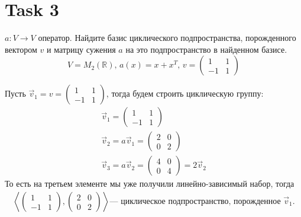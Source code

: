 \section{Task 3}
\begin{task}
    $a:V\longrightarrow V$ оператор. Найдите базис циклического подпространства, порожденного вектором $v$ и матрицу сужения $a$ на это подпространство в найденном базисе. $$V=M_2(\mathbb{R}),\, a(x)=x+x^T,\, v=\begin{pmatrix}1&1\\-1&1\end{pmatrix}$$
\end{task}

\begin{solution}
    Пусть $\vec{v}_1 = v = 
    \begin{pmatrix}
        1 & 1 \\
        -1 & 1
    \end{pmatrix}$, тогда будем строить циклическую группу:
    \begin{gather}
        \vec{v}_1 = 
        \begin{pmatrix}
             1 & 1 \\
            -1 & 1
        \end{pmatrix} \\
        \vec{v}_2 = a\vec{v}_1 = 
        \begin{pmatrix}
            2 & 0 \\ 0 & 2
        \end{pmatrix} \\
        \vec{v}_3 = a\vec{v}_2 = 
        \begin{pmatrix}
            4 & 0 \\ 0 & 4
        \end{pmatrix} = 2\vec{v}_2
    \end{gather}
    То есть на третьем элементе мы уже получили линейно-зависимый набор, тогда
    \begin{eqnarray}
        \left<
            \begin{pmatrix}
                1 & 1 \\ -1 & 1
            \end{pmatrix},
            \begin{pmatrix}
                2 & 0 \\
                0 & 2
            \end{pmatrix}
        \right> \text{--- циклическое подпространство, порожденное } \vec{v}_1.
    \end{eqnarray}


\end{solution}

